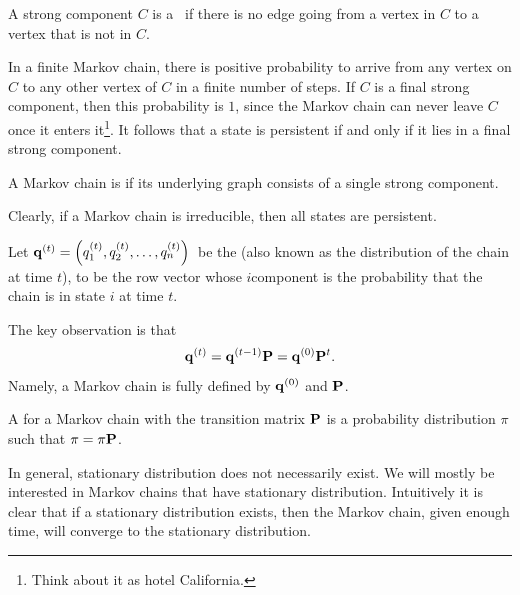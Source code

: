 \begin{defn}
    A strong component $C$ is a \, if
    there is no edge going from a vertex in $C$ to a vertex that is
    not in $C$.
\end{defn}

In a finite Markov chain, there is positive probability to arrive from
any vertex on $C$ to any other vertex of $C$ in a finite number of
steps. If $C$ is a final strong component, then this probability is
$1$, since the Markov chain can never leave $C$ once it enters
it\footnote{Think about it as hotel California.}. It follows that a
state is persistent if and only if it lies in a final strong
component.

\begin{defn}
    A Markov chain is  if its underlying graph
    consists of a single strong component.
\end{defn}

Clearly, if a Markov chain is irreducible, then all states are
persistent.

\begin{defn}
    Let
    $\MCPVec{t} = \pth[]{ q_1^{(t)}, q_2^{(t)}, \ldots, q_n^{(t)} }\,$
    be the  (also known as the
    distribution of the chain at time $t$), to be the row vector whose
    $i$\th component is the probability that the chain is in state $i$
    at time $t$.
\end{defn}

The key observation is that
\begin{equation*}
    \mathbf{q}^{(t)} = \mathbf{q}^{(t-1)} \mathbf{P} = \mathbf{q}^{(0)} \mathbf{P}^{t}.
\end{equation*}
Namely, a Markov chain is fully defined by $\mathbf{q}^{(0)}$ and $\mathbf{P}$.

\begin{defn}
    A  for a Markov chain with the
    transition matrix $\mathbf{P}$ is a probability distribution $\pi$
    such that $\pi = \pi \mathbf{P}$.
\end{defn}

In general, stationary distribution does not necessarily exist. We
will mostly be interested in Markov chains that have stationary
distribution. Intuitively it is clear that if a stationary
distribution exists, then the Markov chain, given enough time, will
converge to the stationary distribution.

